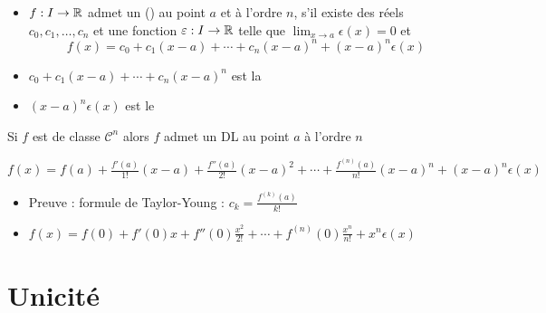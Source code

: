 \begin{frame}
\begin{itemize}
\item 
$f: I \to \mathbb{R}$ admet un  () au point $a$ et à l'ordre $n$, 
s'il existe des réels $c_0, c_1,\ldots,c_n$
et une fonction $\varepsilon : I \to \mathbb{R}$ telle que $\lim_{x\to a} \epsilon(x)=0$ et
$$f(x)=c_0+c_1 (x-a)+\cdots+c_n(x-a)^n+(x-a)^n\epsilon(x)$$

\pause

\item $c_0+c_1(x-a)+\cdots+c_n(x-a)^n$ est la 

\pause

\item $(x-a)^n\epsilon(x)$ est le 
\end{itemize}


\pause

\begin{proposition}
Si $f$ est de classe $\mathcal{C}^n$ alors $f$ admet un DL au point $a$ à l'ordre $n$

\hfil $f(x)= f(a)+\frac{f'(a)}{1!}(x-a)+ \frac{f''(a)}{2!}(x-a)^2+\cdots
+\frac{f^{(n)}(a)}{n!}(x-a)^n+(x-a)^n\epsilon(x)$
\end{proposition}

\pause

\begin{itemize}

  \item Preuve : formule de Taylor-Young : $c_k = \frac{f^{(k)}(a)}{k!}$

\pause

  \item $f(x)= f(0)+f'(0)x+f''(0)\frac{x^2}{2!}+\cdots+f^{(n)}(0)\frac{x^n}{n!} + x^n\epsilon(x)$
\end{itemize}


\end{frame}

\section{Unicité}

